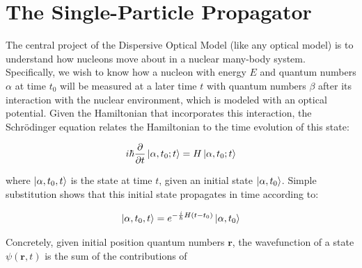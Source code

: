 \section{The Single-Particle Propagator}
The central project of the Dispersive Optical Model (like any optical model) is
to understand how nucleons move about in a nuclear many-body system. Specifically,
we wish to know
how a nucleon with energy $E$ and quantum numbers $\alpha$
at time $t_{0}$ will be measured at a
later time $t$ with quantum numbers $\beta$ after its interaction with the
nuclear environment, which is modeled with an optical potential. Given the
Hamiltonian that incorporates this interaction, the Schr\"odinger equation
relates the Hamiltonian to the time evolution of this state:

\begin{equation}
    i\hbar\frac{\partial}{\partial t}\ket{\alpha, t_{0};t} = H\ket{\alpha,
    t_{0}; t}
\end{equation}

where $\ket{\alpha, t_{0},t}$ is the state at time $t$, given an initial state
$\ket{\alpha, t_{0}}$. Simple substitution shows that this initial state
propagates in time according to:

\begin{equation}
    \ket{\alpha, t_{0}, t} = e^{-\frac{i}{\hbar}H(t-t_{0})}\ket{\alpha, t_{0}}
\end{equation}

Concretely, given initial position quantum numbers $\bm{r}$, the wavefunction
of a state $\psi(\bm{r},t)$ is the sum of the contributions of 

